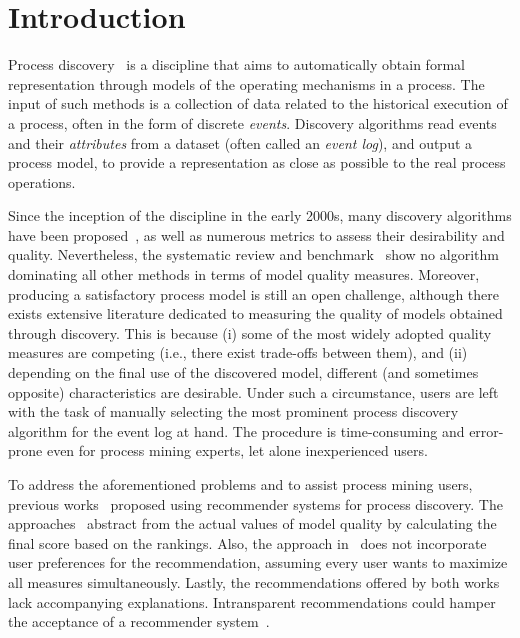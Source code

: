\section{Introduction}\label{sec:inro}

Process discovery~\cite{Aalst16PMbook} is a discipline that aims to automatically obtain formal representation through models of the operating mechanisms in a process. The input of such methods is a collection of data related to the historical execution of a process, often in the form of discrete \emph{events}. 
Discovery algorithms read events and their \emph{attributes} from a dataset (often called an \emph{event log}), and output a process model, to provide a representation as close as possible to the real process operations.

Since the inception of the discipline in the early 2000s, many discovery algorithms have been proposed~\cite{DBLP:books/sp/22/Augusto0022}, as well as numerous metrics to assess their desirability and quality. 
Nevertheless, the systematic review and benchmark~\cite{AugustoCDRMMMS19PDreviewbenchmark} show no algorithm dominating all other methods in terms of model quality measures. 
Moreover, producing a satisfactory process model is still an open challenge, although there exists extensive literature dedicated to measuring the quality of models obtained through discovery. 
This is because (i) some of the most widely adopted quality measures are competing (i.e., there exist trade-offs between them), and (ii) depending on the final use of the discovered model, different (and sometimes opposite) characteristics are desirable. 
Under such a circumstance, users are left with the task of manually selecting the most prominent process discovery algorithm for the event log at hand. 
The procedure is time-consuming and error-prone even for process mining experts, let alone inexperienced users. 

To address the aforementioned problems and to assist process mining users, previous works~\cite{RibeiroCMS14Recommend,TavaresJD22MetaRecommend} proposed using recommender systems for process discovery. 
The approaches~\cite{RibeiroCMS14Recommend,TavaresJD22MetaRecommend} abstract from the actual values of model quality by calculating the final score based on the rankings. 
Also, the approach in~\cite{TavaresJD22MetaRecommend} does not incorporate user preferences for the recommendation, assuming every user wants to maximize all measures simultaneously. 
Lastly, the recommendations offered by both works lack accompanying explanations. 
Intransparent recommendations could hamper the acceptance of a recommender system~\cite{ZhangC20XRecommendation}. 

